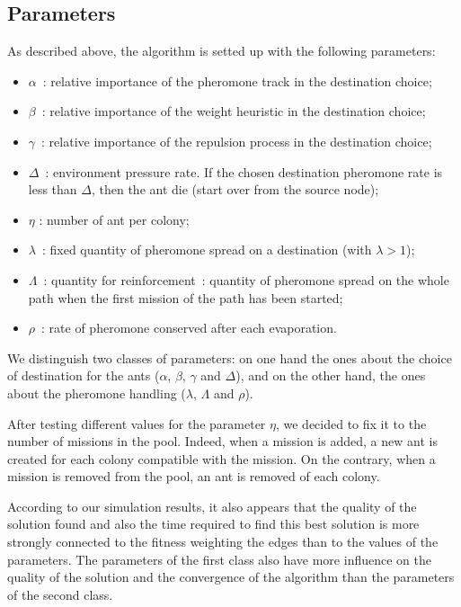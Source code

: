 \documentclass[a4paper,10pt]{article}
\begin{document}
\subsection{Parameters}
As described above, the algorithm is setted up with the following parameters:

\begin{itemize}
 \item $\alpha$ : relative importance of the pheromone track in the destination choice;
 \item $\beta$ :  relative importance of the weight heuristic in the destination choice;
 \item $\gamma$ : relative importance of the repulsion process in the destination choice;
 \item $\Delta$ : environment pressure rate. If the chosen destination pheromone rate is less than $\Delta$, then the ant die (start over from the source node);
 \item $\eta$ : number of ant per colony;
 \item $\lambda$ : fixed quantity of pheromone spread on a destination (with $\lambda > 1$);
 \item $\Lambda$ : quantity for reinforcement : quantity of pheromone spread on the whole path when the first mission of the path has been started;
 \item $\rho$ : rate of pheromone conserved after each evaporation.
\end{itemize}

We distinguish two classes of parameters: on one hand the ones about the choice of destination for the ants ($\alpha$, $\beta$, $\gamma$ and $\Delta$), and on the other hand, the ones about the pheromone handling ($\lambda$, $\Lambda$ and $\rho$).

After testing different values for the parameter $\eta$, we decided to fix it to the number of missions in the pool. Indeed, when a mission is added, a new ant is created for each colony compatible with the mission. On the contrary, when a mission is removed from the pool, an ant is removed of each colony.

According to our simulation results, it also appears that the quality of the solution found and also the time required to find this best solution is more strongly connected to the fitness weighting the edges than to the values of the parameters. The parameters of the first class also have more influence on the quality of the solution and the convergence of the algorithm than the parameters of the second class.
\end{document}
